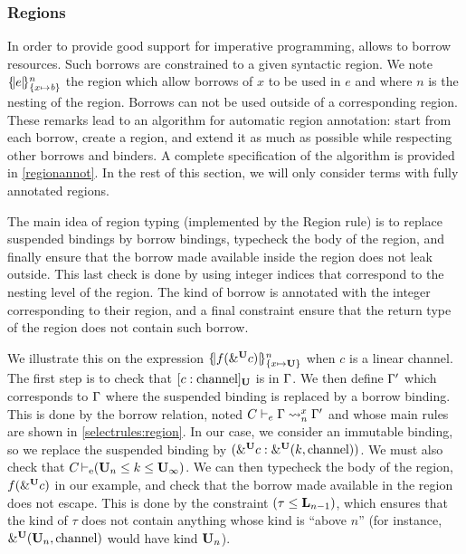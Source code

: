 \subsubsection{Regions}
\label{sdtyping:regions}

In order to provide good support for imperative programming, \affe allows
to borrow resources.
Such borrows are constrained to a given syntactic region. We note
$\region{\Sone x\BORROW}{e}$ the region which allow borrows of $x$ to be used in $e$
and where $n$ is the nesting of the region.
Borrows can not be used outside of a corresponding region.
These remarks lead to an
algorithm for automatic region annotation: start from each borrow, create
a region, and extend it as much as possible while respecting other borrows
and binders.
A complete specification of the algorithm is provided in \cref{regionannot}.
In the rest of this section, we will only consider terms
with fully annotated regions.

The main idea of region typing (implemented by the {\sc Region} rule)
is to replace suspended bindings by borrow bindings, typecheck the body
of the region, and finally ensure that the borrow made available inside
the region does not leak outside.
This last check is done by using integer indices that correspond to the nesting
level of the region. The kind of borrow is annotated with the integer
corresponding to their region, and a final constraint ensure that
the return type of the region does not contain such borrow.

We illustrate this on the expression $\region{\Sone x\IBORROW}{f(\borrow[\IBORROW]{c})}$
when $c$ is a linear channel.
The first step is to check that
$\svar[\IBORROW]{c}{\text{channel}}$ is in $\E$. We then define $\E'$ which
corresponds to $\E$ where the suspended binding is replaced by a borrow binding.
%
This is done by the borrow relation, noted $\lregion{C}{x}{\E}{\E'}$ and
whose main rules are shown in \cref{selectrules:region}.
In our case, we consider an immutable binding, so we replace the suspended
binding by $\bvar{\borrow[\IBORROW]{c}}{\borrowty[\IBORROW]{k}{\text{channel}}}$.
We must also check that $\entail{C}{(\kun_n\lk k\lk\kun_\infty)}$.
We can then typecheck the body of the region, $f(\borrow[\IBORROW]{c})$ in our example, and check that the borrow made available in the region does not escape.
This is done by the constraint $\Cleq{\tau}{\klin_{n-1}}$, which ensures
that the kind of $\tau$ does not contain anything whose kind is ``above $n$''
(for instance, $\borrowty[\IBORROW]{\kun_n}{\text{channel}}$ would have kind
$\kun_n$).

